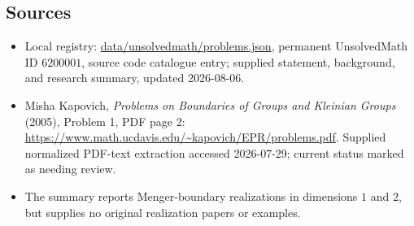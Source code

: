 \documentclass[11pt]{article}
\begin{document}
\subsection{Sources}
\begin{itemize}
\item Local registry: \url{data/unsolvedmath/problems.json}, permanent UnsolvedMath ID \(6200001\), source code catalogue entry; supplied statement, background, and research summary, updated 2026-08-06.
\item Misha Kapovich, \emph{Problems on Boundaries of Groups and Kleinian Groups} (2005), Problem 1, PDF page 2: \url{https://www.math.ucdavis.edu/~kapovich/EPR/problems.pdf}. Supplied normalized PDF-text extraction accessed 2026-07-29; current status marked as needing review.
\item The summary reports Menger-boundary realizations in dimensions \(1\) and \(2\), but supplies no original realization papers or examples.
\end{itemize}
\end{document}
